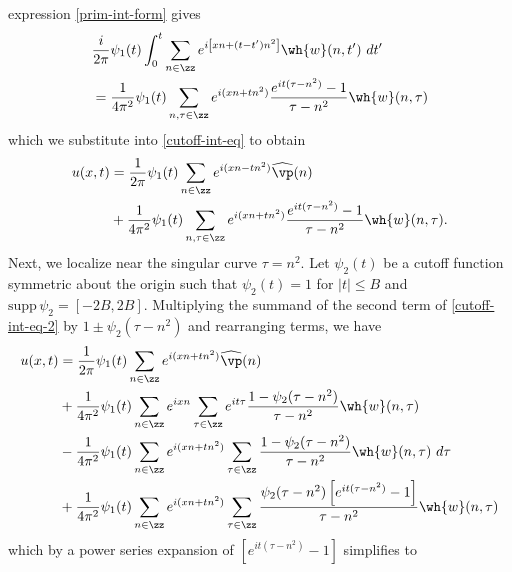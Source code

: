 expression \eqref{prim-int-form} gives
%
%
%
\begin{equation*}
	\begin{split}
		& \frac{i }{2 \pi} \psi_1(t) \int_0^t \sum_{n \in \zz} 
		e^{i\left[ xn + (t - t')n^2 \right]} \wh{w}(n, t') \ dt'
		\\
		& = \frac{1}{4 \pi^2} \psi_1(t) \sum_{n, \tau \in \zz} 
		e^{i(xn + tn^2)} \frac{e^{it(\tau - n^2)}- 1}{\tau - n^2} 
		\wh{w}(n, \tau)  
		\end{split}
\end{equation*}
%
%
which we substitute
into \eqref{cutoff-int-eq} to obtain
%
%
\begin{equation}
	\begin{split}
		\label{cutoff-int-eq-2}
		u(x, t)
		& = \frac{1}{2 \pi} \psi_1(t) \sum_{n \in \zz} e^{i(xn - tn^{2  
		})} \widehat{\vp}(n) 
		\\
		& + \frac{1}{4 \pi^2} \psi_1(t) \sum_{n, \tau \in \zz} 
		e^{i(xn + tn^2)} \frac{e^{it(\tau - n^2)}- 1}{\tau - n^2} \wh{w}(n, 
		\tau). 
	\end{split}
\end{equation}
%
%
Next, we localize near the singular curve $\tau = n^2$. Let $\psi_2(t)$ be a cutoff function symmetric about the origin such that 
$\psi_2(t) = 1$ for $|t| \le B$ and $\text{supp} \, \psi_2 = 
[-2B, 2 B]$.
Multiplying the summand of the second term of \eqref{cutoff-int-eq-2} by $1 \pm \psi_2(\tau - n^2)$ and rearranging 
terms, we have
%
%
\begin{equation*}
	\begin{split}
		 u(x, t)
		& = \frac{1}{2 \pi} \psi_1(t) \sum_{n \in \zz} e^{i(xn + tn^{2 
		})} \widehat{\vp}(n) 
		\\
		& + \frac{1}{4 \pi^2} \psi_1(t) \sum_{n \in \zz} e^{ixn} \sum_{\tau \in \zz} 
		e^{it \tau} \frac{ 1 - \psi_2(\tau - n^2) 
		}{\tau - n^2} \wh{w}(n, \tau) 
		\\
		& - \frac{1}{4 \pi^2} \psi_1(t) \sum_{n \in \zz} e^{i(xn + 
		tn^2)}
		\sum_{\tau \in \zz} \frac{1- \psi_2(\tau - n^2)}{\tau - n^2} \wh{w}(n, \tau) \ 
		d\tau
		\\
		& + \frac{1}{4 \pi^2} \psi_1(t) \sum_{n \in \zz}
		e^{i(xn + tn^2)}
		\sum_{\tau \in \zz} 
		\frac{\psi_2(\tau - n^2)\left[ e^{it(\tau - n^2)}-1 
		\right]}{\tau - n^2} \wh{w}(n, \tau) 
	\end{split}
\end{equation*}
%
%
which by a power series expansion of $[e^{it(\tau - n^2)}-1]$ simplifies  to
%
%
